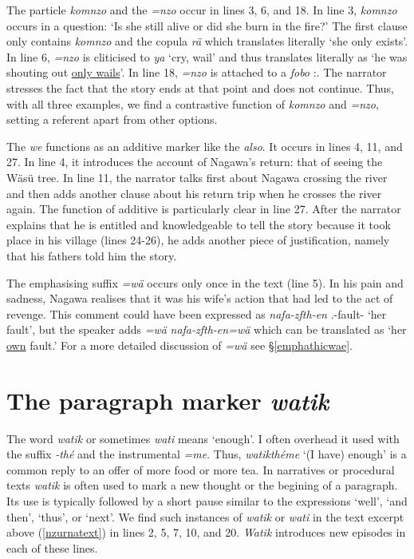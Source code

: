 The particle \emph{komnzo} and the  \emph{=nzo} occur in lines 3, 6, and 18. In line 3, \emph{komnzo} occurs in a question: `Is she still alive or did she burn in the fire?' The first clause only contains \emph{komnzo} and the copula \emph{rä} which translates literally `she only exists'. In line 6, \emph{=nzo} is cliticised to \emph{ya} `cry, wail' and thus translates literally as `he was shouting out \uline{only wails}'. In line 18, \emph{=nzo} is attached to a  \emph{fobo} \Dist:\All{}. The narrator stresses the fact that the story ends at that point and does not continue. Thus, with all three examples, we find a contrastive function of \emph{komnzo} and \emph{=nzo}, setting a referent apart from other options.%

The  \emph{we} functions as an additive marker like the   \emph{also}. It occurs in lines 4, 11, and 27. In line 4, it introduces the account of Nagawa's return: that of seeing the Wäsü tree. In line 11, the narrator talks first about Nagawa crossing the river and then adds another clause about his return trip when he crosses the river again. The function of additive  is particularly clear in line 27. After the narrator explains that he is entitled and knowledgeable to tell the story because it took place in his village (lines 24-26), he adds another piece of justification, namely that his fathers told him the story.%

The emphasising suffix \emph{=wä} occurs only once in the text (line 5). In his pain and sadness, Nagawa realises that it was his wife's action that had led to the act of revenge. This comment could have been expressed as \emph{nafa-zfth-en} \Third.\Poss-fault-\Loc{} `her fault', but the speaker adds \emph{=wä} \emph{nafa-zfth-en=wä} which can be translated as `her \uline{own} fault.' For a more detailed discussion of \emph{=wä} see \S{}\ref{emphathicwae}.

\section{The paragraph marker \emph{watik}} \label{watik}

The word \emph{watik} or sometimes \emph{wati} means `enough'. I often overhead it used with the  suffix \emph{-thé} and the instrumental \emph{=me}. Thus, \emph{watikthéme} `(I have) enough' is a common reply to an offer of more food or more tea. In narratives or procedural texts \emph{watik} is often used to mark a new thought or the begining of a paragraph. Its use is typically followed by a short pause similar to the  expressions `well', `and then', `thus', or `next'. We find such instances of \emph{watik} or \emph{wati} in the text excerpt above (\ref{nzurnatext}) in lines 2, 5, 7, 10, and 20. \emph{Watik} introduces new episodes in each of these lines.

